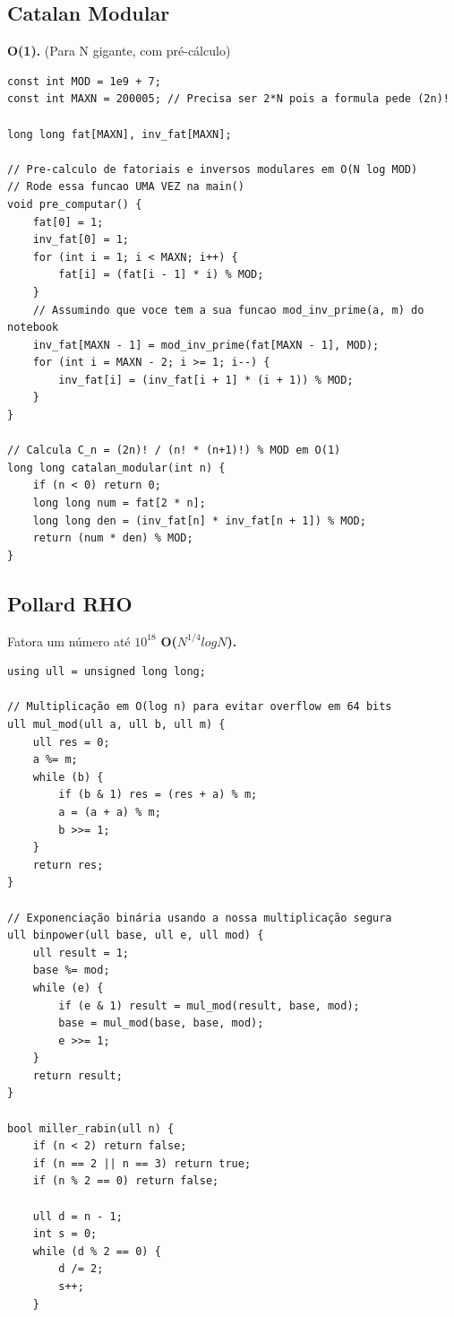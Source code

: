 \documentclass[11pt]{article}
\begin{document}
\begin{multicols}{2}
\subsection{Catalan Modular}
\textbf{O(1).} (Para N gigante, com pré-cálculo)
\begin{lstlisting}
const int MOD = 1e9 + 7;
const int MAXN = 200005; // Precisa ser 2*N pois a formula pede (2n)!

long long fat[MAXN], inv_fat[MAXN];

// Pre-calculo de fatoriais e inversos modulares em O(N log MOD)
// Rode essa funcao UMA VEZ na main()
void pre_computar() {
    fat[0] = 1;
    inv_fat[0] = 1;
    for (int i = 1; i < MAXN; i++) {
        fat[i] = (fat[i - 1] * i) % MOD;
    }
    // Assumindo que voce tem a sua funcao mod_inv_prime(a, m) do notebook
    inv_fat[MAXN - 1] = mod_inv_prime(fat[MAXN - 1], MOD);
    for (int i = MAXN - 2; i >= 1; i--) {
        inv_fat[i] = (inv_fat[i + 1] * (i + 1)) % MOD;
    }
}

// Calcula C_n = (2n)! / (n! * (n+1)!) % MOD em O(1)
long long catalan_modular(int n) {
    if (n < 0) return 0;
    long long num = fat[2 * n];
    long long den = (inv_fat[n] * inv_fat[n + 1]) % MOD;
    return (num * den) % MOD;
}
\end{lstlisting}

\subsection{Pollard RHO}
Fatora um número até $10^{18}$ \textbf{O($N^{1/4}logN$).}
\begin{lstlisting}
using ull = unsigned long long;

// Multiplicação em O(log n) para evitar overflow em 64 bits
ull mul_mod(ull a, ull b, ull m) {
    ull res = 0;
    a %= m;
    while (b) {
        if (b & 1) res = (res + a) % m;
        a = (a + a) % m;
        b >>= 1;
    }
    return res;
}

// Exponenciação binária usando a nossa multiplicação segura
ull binpower(ull base, ull e, ull mod) {
    ull result = 1;
    base %= mod;
    while (e) {
        if (e & 1) result = mul_mod(result, base, mod);
        base = mul_mod(base, base, mod);
        e >>= 1;
    }
    return result;
}

bool miller_rabin(ull n) {
    if (n < 2) return false;
    if (n == 2 || n == 3) return true;
    if (n % 2 == 0) return false;

    ull d = n - 1;
    int s = 0;
    while (d % 2 == 0) {
        d /= 2;
        s++;
    }


\end{lstlisting}
\end{multicols}
\end{document}
